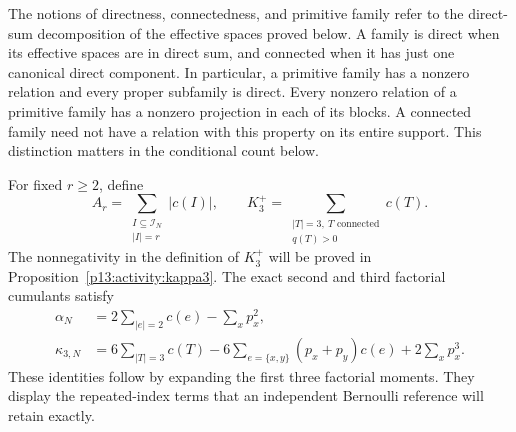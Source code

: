 The notions of directness, connectedness, and primitive family
refer to the direct-sum decomposition of the effective spaces
proved below. A family is direct when its
effective spaces are in direct sum, and connected when it has just one
canonical direct component. In particular, a primitive
family has a nonzero relation and every proper subfamily is
direct. Every nonzero relation of a primitive family has a
nonzero projection in each of its blocks. A connected family
need not have a relation with this property on its entire
support. This distinction matters in the conditional count below.

For fixed \(r\ge2\), define
\begin{equation}
 A_r=\sum_{\substack{I\subseteq\mathcal I_N\\|I|=r}}|c(I)|,
 \qquad
 K_3^+=\sum_{\substack{|T|=3,\ T\text{ connected}\\q(T)>0}}c(T).
 \label{p13:exact:activities}
\end{equation}
The nonnegativity in the definition of \(K_3^+\) will be proved
in Proposition~\ref{p13:activity:kappa3}.
The exact second and third factorial cumulants satisfy
\begin{align}
 \alpha_N&=2\sum_{|e|=2}c(e)-\sum_xp_x^2,
 \label{p13:exact:alpha}\\
 \kappa_{3,N}
   &=6\sum_{|T|=3}c(T)
       -6\sum_{e=\{x,y\}}(p_x+p_y)c(e)
       +2\sum_xp_x^3.
 \label{p13:exact:kappa3}
\end{align}
These identities follow by expanding the first three factorial
moments. They display the repeated-index terms that an
independent Bernoulli reference will retain exactly.

